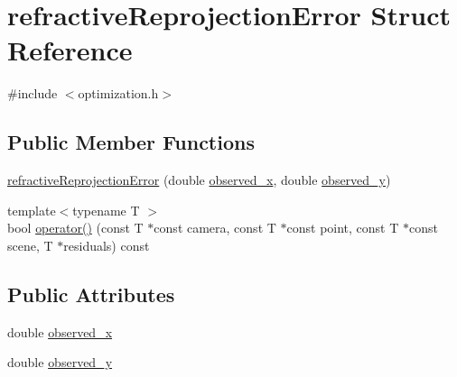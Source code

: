 \hypertarget{structrefractiveReprojectionError}{\section{refractive\-Reprojection\-Error Struct Reference}
\label{d8/d20/structrefractiveReprojectionError}
}


{\ttfamily \#include $<$optimization.\-h$>$}

\subsection*{Public Member Functions}
\begin{DoxyCompactItemize}
\item 
\hyperlink{structrefractiveReprojectionError_a0bd1a52a65545d440518fa718beba32b}{refractive\-Reprojection\-Error} (double \hyperlink{structrefractiveReprojectionError_a7992f6f0be264e8a5f72027ac5897581}{observed\-\_\-x}, double \hyperlink{structrefractiveReprojectionError_aa2f04966bc8045945bee5487a0b6fac7}{observed\-\_\-y})
\item 
{\footnotesize template$<$typename T $>$ }\\bool \hyperlink{structrefractiveReprojectionError_ac25617f3bbdb148e1591a64895c1444c}{operator()} (const T $\ast$const camera, const T $\ast$const point, const T $\ast$const scene, T $\ast$residuals) const 
\end{DoxyCompactItemize}
\subsection*{Public Attributes}
\begin{DoxyCompactItemize}
\item 
double \hyperlink{structrefractiveReprojectionError_a7992f6f0be264e8a5f72027ac5897581}{observed\-\_\-x}
\item 
double \hyperlink{structrefractiveReprojectionError_aa2f04966bc8045945bee5487a0b6fac7}{observed\-\_\-y}
\end{DoxyCompactItemize}


